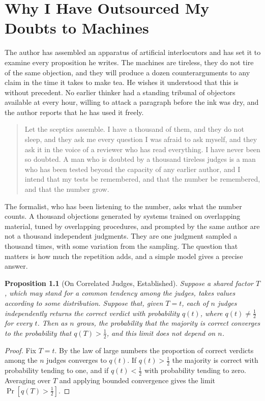 \documentclass[11pt,openany,twoside]{book}
\theoremstyle{plain}
\newtheorem{proposition}{Proposition}[chapter]
\theoremstyle{definition}
\theoremstyle{remark}
\begin{document}
\chapter{Why I Have Outsourced My Doubts to Machines}

The author has assembled an apparatus of artificial interlocutors and has set it to examine every proposition he writes. The machines are tireless, they do not tire of the same objection, and they will produce a dozen counterarguments to any claim in the time it takes to make tea. He wishes it understood that this is without precedent. No earlier thinker had a standing tribunal of objectors available at every hour, willing to attack a paragraph before the ink was dry, and the author reports that he has used it freely.

\begin{quotation}\noindent Let the sceptics assemble. I have a thousand of them, and they do not sleep, and they ask me every question I was afraid to ask myself, and they ask it in the voice of a reviewer who has read everything. I have never been so doubted. A man who is doubted by a thousand tireless judges is a man who has been tested beyond the capacity of any earlier author, and I intend that my tests be remembered, and that the number be remembered, and that the number grow.
\end{quotation}

The formalist, who has been listening to the number, asks what the number counts. A thousand objections generated by systems trained on overlapping material, tuned by overlapping procedures, and prompted by the same author are not a thousand independent judgments. They are one judgment sampled a thousand times, with some variation from the sampling. The question that matters is how much the repetition adds, and a simple model gives a precise answer.

\begin{proposition}[On Correlated Judges, Established]\label{prop:judges}
Suppose a shared factor $T$, which may stand for a common tendency among the judges, takes values according to some distribution. Suppose that, given $T=t$, each of $n$ judges independently returns the correct verdict with probability $q(t)$, where $q(t)\ne \tfrac12$ for every $t$. Then as $n$ grows, the probability that the majority is correct converges to the probability that $q(T)>\tfrac12$, and this limit does not depend on $n$.
\end{proposition}

\begin{proof}
Fix $T=t$. By the law of large numbers the proportion of correct verdicts among the $n$ judges converges to $q(t)$. If $q(t)>\tfrac12$ the majority is correct with probability tending to one, and if $q(t)<\tfrac12$ with probability tending to zero. Averaging over $T$ and applying bounded convergence gives the limit $\Pr[q(T)>\tfrac12]$.
\end{proof}
\end{document}
